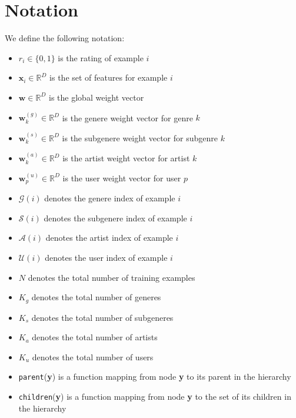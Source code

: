 \documentclass[11pt, a4paper]{article}
\begin{document}
\section{Notation}
We define the following notation:\begin{itemize}
                                   \item $r_i\in \{0,1\}$ is the rating of example $i$
                                   \item $\textbf{x}_i\in \mathbb{R}^D$ is the set of features for example $i$
                                   \item $\textbf{w} \in \mathbb{R}^D$ is the global weight vector
                                   \item $\textbf{w}^{(g)}_k \in \mathbb{R}^D$ is the genere weight vector for genre $k$
                                   \item $\textbf{w}^{(s)}_k \in \mathbb{R}^D$ is the subgenere weight vector for subgenre $k$
                                   \item $\textbf{w}^{(a)}_k \in \mathbb{R}^D$ is the artist weight vector for artist $k$
                                   \item $\textbf{w}^{(u)}_p \in \mathbb{R}^D$ is the user weight vector for user $p$
                                   \item $\mathcal{G}(i)$ denotes the genere index of example $i$
                                   \item $\mathcal{S}(i)$ denotes the subgenere index of example $i$
                                   \item $\mathcal{A}(i)$ denotes the artist index of example $i$
                                   \item $\mathcal{U}(i)$ denotes the user index of example $i$
                                   \item $N$ denotes the total number of training examples
                                   \item $K_g$ denotes the total number of generes
                                   \item $K_s$ denotes the total number of subgeneres
                                   \item $K_a$ denotes the total number of artists
                                   \item $K_u$ denotes the total number of users
                                   \item  \texttt{parent}(\textbf{y}) is a function mapping from node \textbf{y} to its parent in the hierarchy
                                   \item  \texttt{children}(\textbf{y}) is a function mapping from node \textbf{y} to the set of its children in the hierarchy

                                 \end{itemize}
\end{document}
